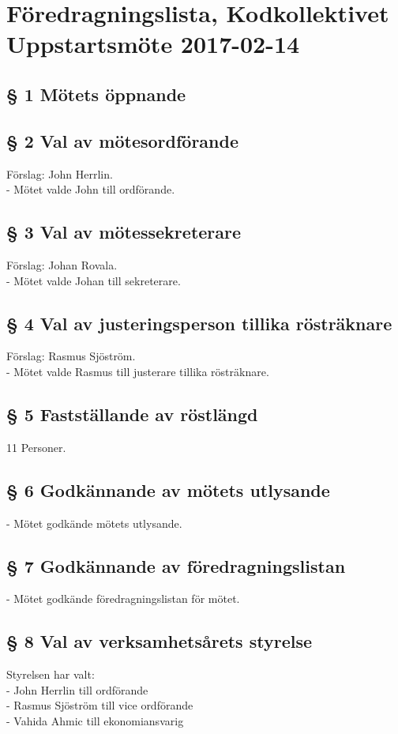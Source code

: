\documentclass[11pt,swedish]{article}
\begin{document}
\section{\large Föredragningslista, Kodkollektivet Uppstartsmöte 2017-02-14}

\subsection{§ 1  Mötets öppnande}

\subsection{§ 2  Val av mötesordförande}
		Förslag: John Herrlin. \\
		\noindent - Mötet valde John till ordförande.

\subsection{§ 3  Val av mötessekreterare}
		Förslag: Johan Rovala. \\
		\noindent - Mötet valde Johan till sekreterare.

\subsection{§ 4  Val av justeringsperson tillika rösträknare}
		Förslag: Rasmus Sjöström. \\
		\noindent - Mötet valde Rasmus till justerare tillika rösträknare.

\subsection{§ 5  Fastställande av röstlängd}
		11 Personer.

\subsection{§ 6  Godkännande av mötets utlysande}
	- Mötet godkände mötets utlysande.
	
\subsection{§ 7  Godkännande av föredragningslistan}
	- Mötet godkände föredragningslistan för mötet.
	
\clearpage
\subsection{§ 8  Val av verksamhetsårets styrelse}
	Styrelsen har valt: \\
	- John Herrlin till ordförande \\
	- Rasmus Sjöström till vice ordförande \\
	- Vahida Ahmic till ekonomiansvarig \\
	
\end{document}
